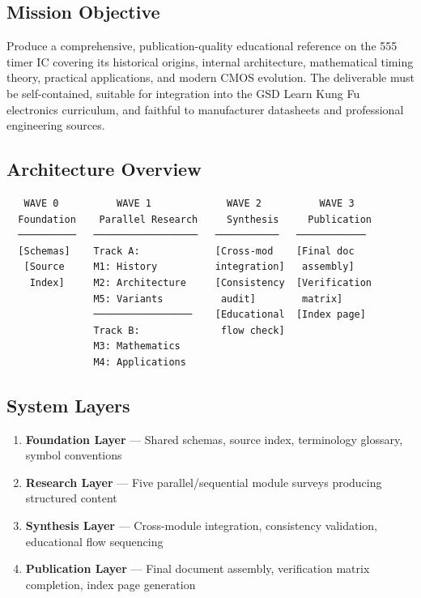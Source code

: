 \documentclass[11pt,letterpaper]{article}
\begin{document}
\subsection{Mission Objective}

Produce a comprehensive, publication-quality educational reference on the 555 timer IC covering its historical origins, internal architecture, mathematical timing theory, practical applications, and modern CMOS evolution. The deliverable must be self-contained, suitable for integration into the GSD Learn Kung Fu electronics curriculum, and faithful to manufacturer datasheets and professional engineering sources.

\subsection{Architecture Overview}

\begin{asciibox}
\begin{verbatim}
   WAVE 0          WAVE 1             WAVE 2          WAVE 3
  Foundation    Parallel Research     Synthesis     Publication
  ──────────   ──────────────────   ───────────   ────────────
  [Schemas]    Track A:             [Cross-mod    [Final doc
   [Source     M1: History          integration]   assembly]
    Index]     M2: Architecture     [Consistency  [Verification
               M5: Variants          audit]        matrix]
               ─────────────────    [Educational  [Index page]
               Track B:              flow check]
               M3: Mathematics
               M4: Applications
\end{verbatim}
\end{asciibox}

\subsection{System Layers}

\begin{enumerate}[leftmargin=2em]
  \item \textbf{Foundation Layer} --- Shared schemas, source index, terminology glossary, symbol conventions
  \item \textbf{Research Layer} --- Five parallel/sequential module surveys producing structured content
  \item \textbf{Synthesis Layer} --- Cross-module integration, consistency validation, educational flow sequencing
  \item \textbf{Publication Layer} --- Final document assembly, verification matrix completion, index page generation
\end{enumerate}
\end{document}
